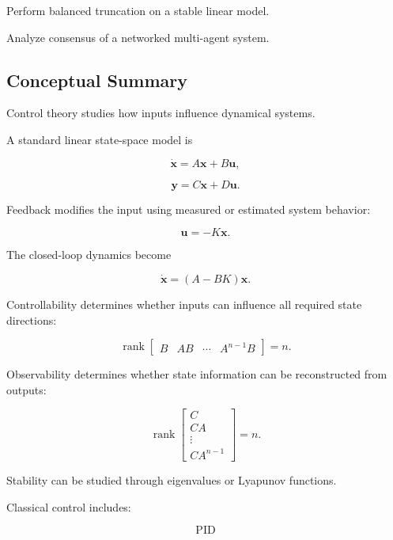 \begin{exercise}[4]
Perform balanced truncation on a stable linear model.
\end{exercise}

\begin{exercise}[4]
Analyze consensus of a networked multi-agent system.
\end{exercise}

\subsection{Conceptual Summary}
\label{subsec:control-theory-summary}

Control theory studies how inputs influence dynamical systems.

A standard linear state-space model is

\[
\boxed{
\dot{\mathbf{x}}
=
A\mathbf{x}
+
B\mathbf{u},
}
\]

\[
\boxed{
\mathbf{y}
=
C\mathbf{x}
+
D\mathbf{u}.
}
\]

Feedback modifies the input using measured or estimated system behavior:

\[
\boxed{
\mathbf{u}
=
-K\mathbf{x}.
}
\]

The closed-loop dynamics become

\[
\boxed{
\dot{\mathbf{x}}
=
(A-BK)\mathbf{x}.
}
\]

Controllability determines whether inputs can influence all required state
directions:

\[
\boxed{
\operatorname{rank}
\begin{bmatrix}
B & AB & \cdots & A^{n-1}B
\end{bmatrix}
=
n.
}
\]

Observability determines whether state information can be reconstructed from
outputs:

\[
\boxed{
\operatorname{rank}
\begin{bmatrix}
C\\
CA\\
\vdots\\
CA^{n-1}
\end{bmatrix}
=
n.
}
\]

Stability can be studied through eigenvalues or Lyapunov functions.

Classical control includes:

\[
\boxed{
\text{PID}
}
\]

